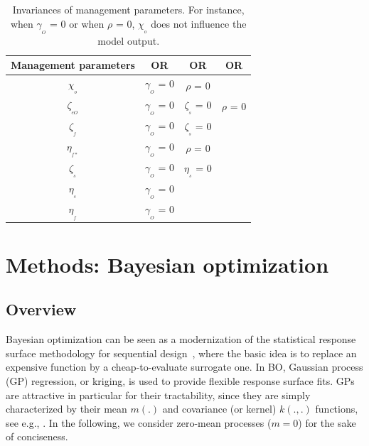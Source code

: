 	\begin{table}[htbp]
		\centering
		\caption{Invariances of management parameters. For instance, when  $\gamma_{_O}$ = 0 or when $\rho$ = 0, $\chi_{_o}$ does not influence the model output. }
		\begin{tabular}{|c|c|c|c|}
			\midrule
			\textbf{Management parameters} & \textbf{OR} & \textbf{OR} & \textbf{OR} \\
			\midrule
			$\chi_{_o}$ & $\gamma_{_O}$ = 0 & $\rho$ = 0 & \\
			\midrule
			$\zeta_{_{eO}}$ & $\gamma_{_O}$ = 0 & $\zeta_{_s}$ = 0 & $\rho$ = 0\\
			\midrule
			$\zeta_{_f}$ & $\gamma_{_O}$ = 0 & $\zeta_{_s}$ = 0 & \\
			\midrule
			$\eta_{_{f*}}$ & $\gamma_{_O}$ = 0 & $\rho$ = 0 & \\
			\midrule
			$\zeta_{_s}$ & $\gamma_{_O}$ = 0 & $\eta_{_s}$ = 0 & \\
			\midrule
			$\eta_{_s}$ & $\gamma_{_O}$ = 0 & & \\
			\midrule
			$\eta_{_f}$ & $\gamma_{_O}$ = 0 & & \\
			\midrule
			
		\end{tabular}%
		\label{tab:table_invariances_parameters}%
	\end{table}%


\section{Methods: Bayesian optimization}\label{sec:bo}

\subsection{Overview}
Bayesian optimization can be seen as a modernization of the statistical response surface
methodology for sequential design~\cite{box1987empirical}, where the basic idea is to replace an expensive  function by a cheap-to-evaluate surrogate one.
In BO, Gaussian process (GP) regression, or kriging, is used to provide flexible response surface fits.
GPs are attractive in particular for their tractability, 
since they are simply characterized by their mean $m(.)$ and covariance (or kernel) $k(.,.)$ functions, see e.g., \citet{Rasmussen2006}. 
In the following, we consider zero-mean processes ($m = 0$) for the sake of conciseness.

